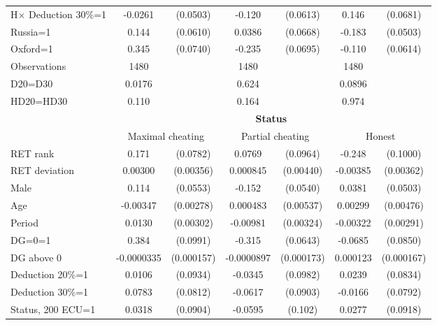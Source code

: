 \begin{tabular}{lcccccc}
H$\times$ Deduction 30\%=1&  -0.0261         & (0.0503)&   -0.120\sym{**} & (0.0613)&    0.146\sym{**} & (0.0681)\\
Russia=1        &    0.144\sym{**} & (0.0610)&   0.0386         & (0.0668)&   -0.183\sym{***}& (0.0503)\\
Oxford=1        &    0.345\sym{***}& (0.0740)&   -0.235\sym{***}& (0.0695)&   -0.110\sym{*}  & (0.0614)\\
\hline
Observations    &     1480         &         &     1480         &         &     1480         &         \\
D20=D30         &   0.0176         &         &    0.624         &         &   0.0896         &         \\
HD20=HD30       &    0.110         &         &    0.164         &         &    0.974         &         \\
\hline\hline
&\multicolumn{6}{c}{\bf Status}\\
                &\multicolumn{2}{c}{Maximal cheating}&\multicolumn{2}{c}{Partial cheating}&\multicolumn{2}{c}{Honest}  \\
\hline
RET rank        &    0.171\sym{**} & (0.0782)&   0.0769         & (0.0964)&   -0.248\sym{**} & (0.1000)\\
RET deviation   &  0.00300         &(0.00356)& 0.000845         &(0.00440)& -0.00385         &(0.00362)\\
Male            &    0.114\sym{**} & (0.0553)&   -0.152\sym{***}& (0.0540)&   0.0381         & (0.0503)\\
Age             & -0.00347         &(0.00278)& 0.000483         &(0.00537)&  0.00299         &(0.00476)\\
Period          &   0.0130\sym{***}&(0.00302)& -0.00981\sym{***}&(0.00324)& -0.00322         &(0.00291)\\
DG=0=1          &    0.384\sym{***}& (0.0991)&   -0.315\sym{***}& (0.0643)&  -0.0685         & (0.0850)\\
DG above 0      &-0.0000335         &(0.000157)&-0.0000897         &(0.000173)& 0.000123         &(0.000167)\\
Deduction 20\%=1&   0.0106         & (0.0934)&  -0.0345         & (0.0982)&   0.0239         & (0.0834)\\
Deduction 30\%=1&   0.0783         & (0.0812)&  -0.0617         & (0.0903)&  -0.0166         & (0.0792)\\
Status, 200 ECU=1&   0.0318         & (0.0904)&  -0.0595         &  (0.102)&   0.0277         & (0.0918)\\

\end{tabular}
